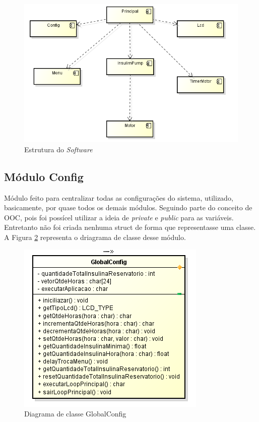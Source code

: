 \begin{figure}[htp]
	\centering
	\includegraphics[scale=0.7]{images/arquitetura.png}
	\caption{Estrutura do \emph{Software}}	
	\label{fig:arquiteturageral}
\end{figure}

\subsection{Módulo Config}

Módulo feito para centralizar todas as configurações do sistema, utilizado, basicamente, por quase todos os demais módulos. Seguindo parte do conceito de OOC, pois foi possícel utilizar a ideia de \emph{private} e \emph{public} para as variáveis. Entretanto não foi criada nenhuma struct de forma que representasse uma classe. A Figura \ref{fig:driagramaclasseconfig} representa o driagrama de classe desse módulo.


\begin{figure}[htp]
	\centering
	\includegraphics[scale=1]{images/classe_GlobalConfig.png}
	\caption{Diagrama de classe GlobalConfig}	
	\label{fig:driagramaclasseconfig}
\end{figure}

